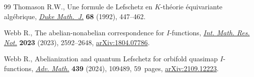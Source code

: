 \documentclass[11pt]{article}
\numberwithin{equation}{section}
\numberwithin{equation}{section}
\begin{document}
\begin{thebibliography}{99}
Thomason R.W., Une formule de {L}efschetz en {$K$}-th\'eorie \'equivariante
 alg\'ebrique, \href{https://doi.org/10.1215/S0012-7094-92-06817-7}{\textit{Duke Math.~J.}} \textbf{68} (1992), 447--462.

Webb R., The abelian-nonabelian correspondence for {$I$}-functions,
 \href{https://doi.org/10.1093/imrn/rnab305}{\textit{Int. Math. Res. Not.}} \textbf{2023} (2023), 2592--2648,
 \href{https://arxiv.org/abs/1804.07786}{arXiv:1804.07786}.

Webb R., Abelianization and quantum {L}efschetz for orbifold quasimap
 {$I$}-functions, \href{https://doi.org/10.1016/j.aim.2024.109489}{\textit{Adv. Math.}} \textbf{439} (2024), 109489, 59~pages,
 \href{https://arxiv.org/abs/2109.12223}{arXiv:2109.12223}.

\end{thebibliography}
\end{document}
